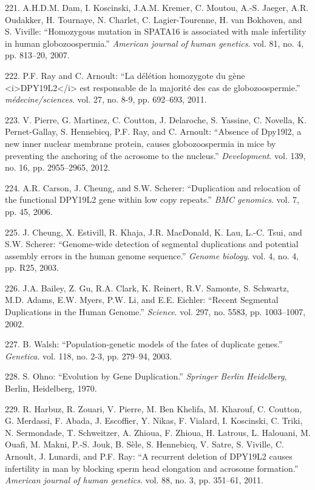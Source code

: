\documentclass[12pt,a4paper,twoside]{ugathesis}
\theoremstyle{definition}
\theoremstyle{definition}
\theoremstyle{definition}
\theoremstyle{remark}
\begin{document}
\hypertarget{ref-Dam2007}{}
221. A.H.D.M. Dam, I. Koscinski, J.A.M. Kremer, C. Moutou, A.-S. Jaeger,
A.R. Oudakker, H. Tournaye, N. Charlet, C. Lagier-Tourenne, H. van
Bokhoven, and S. Viville: ``Homozygous mutation in SPATA16 is associated
with male infertility in human globozoospermia.'' \emph{American journal
of human genetics}. vol. 81, no. 4, pp. 813--20, 2007.

\hypertarget{ref-Ray2011}{}
222. P.F. Ray and C. Arnoult: ``La délétion homozygote du gène
\textless{}i\textgreater{}DPY19L2\textless{}/i\textgreater{} est
responsable de la majorité des cas de globozoospermie.''
\emph{médecine/sciences}. vol. 27, no. 8-9, pp. 692--693, 2011.

\hypertarget{ref-Pierre2012}{}
223. V. Pierre, G. Martinez, C. Coutton, J. Delaroche, S. Yassine, C.
Novella, K. Pernet-Gallay, S. Hennebicq, P.F. Ray, and C. Arnoult:
``Absence of Dpy19l2, a new inner nuclear membrane protein, causes
globozoospermia in mice by preventing the anchoring of the acrosome to
the nucleus.'' \emph{Development}. vol. 139, no. 16, pp. 2955--2965,
2012.

\hypertarget{ref-Carson2006}{}
224. A.R. Carson, J. Cheung, and S.W. Scherer: ``Duplication and
relocation of the functional DPY19L2 gene within low copy repeats.''
\emph{BMC genomics}. vol. 7, pp. 45, 2006.

\hypertarget{ref-Cheung2003}{}
225. J. Cheung, X. Estivill, R. Khaja, J.R. MacDonald, K. Lau, L.-C.
Tsui, and S.W. Scherer: ``Genome-wide detection of segmental
duplications and potential assembly errors in the human genome
sequence.'' \emph{Genome biology}. vol. 4, no. 4, pp. R25, 2003.

\hypertarget{ref-Bailey2002}{}
226. J.A. Bailey, Z. Gu, R.A. Clark, K. Reinert, R.V. Samonte, S.
Schwartz, M.D. Adams, E.W. Myers, P.W. Li, and E.E. Eichler: ``Recent
Segmental Duplications in the Human Genome.'' \emph{Science}. vol. 297,
no. 5583, pp. 1003--1007, 2002.

\hypertarget{ref-Walsh2003}{}
227. B. Walsh: ``Population-genetic models of the fates of duplicate
genes.'' \emph{Genetica}. vol. 118, no. 2-3, pp. 279--94, 2003.

\hypertarget{ref-Ohno1970}{}
228. S. Ohno: ``Evolution by Gene Duplication.'' \emph{Springer Berlin
Heidelberg}, Berlin, Heidelberg, 1970.

\hypertarget{ref-Harbuz2011a}{}
229. R. Harbuz, R. Zouari, V. Pierre, M. Ben Khelifa, M. Kharouf, C.
Coutton, G. Merdassi, F. Abada, J. Escoffier, Y. Nikas, F. Vialard, I.
Koscinski, C. Triki, N. Sermondade, T. Schweitzer, A. Zhioua, F. Zhioua,
H. Latrous, L. Halouani, M. Ouafi, M. Makni, P.-S. Jouk, B. Sèle, S.
Hennebicq, V. Satre, S. Viville, C. Arnoult, J. Lunardi, and P.F. Ray:
``A recurrent deletion of DPY19L2 causes infertility in man by blocking
sperm head elongation and acrosome formation.'' \emph{American journal
of human genetics}. vol. 88, no. 3, pp. 351--61, 2011.
\end{document}
